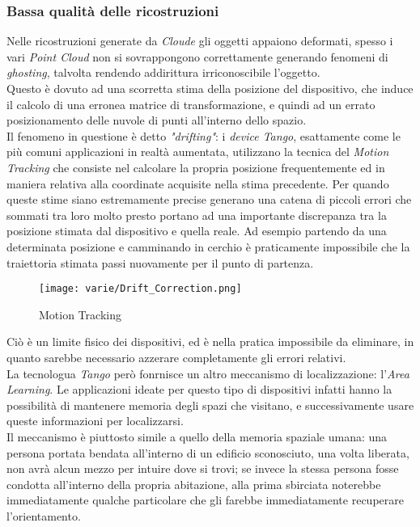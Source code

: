 \subsubsection{Bassa qualità delle ricostruzioni}
Nelle ricostruzioni generate da \emph{Cloude} gli oggetti appaiono deformati, spesso i vari \emph{Point Cloud} non si sovrappongono correttamente generando fenomeni di \emph{ghosting}, talvolta rendendo addirittura irriconoscibile l'oggetto.\\
Questo è dovuto ad una scorretta stima della posizione del dispositivo, che induce il calcolo di una erronea matrice di transformazione, e quindi ad un errato posizionamento delle nuvole di punti all'interno dello spazio.\\
Il fenomeno in questione è detto \emph{"drifting"}: i \emph{device Tango}, esattamente come le più comuni applicazioni in realtà aumentata, utilizzano la tecnica del \emph{Motion Tracking} che consiste nel calcolare la propria posizione frequentemente ed in maniera relativa alla coordinate acquisite nella stima precedente. Per quando queste stime siano estremamente precise generano una catena di piccoli errori che sommati tra loro molto presto portano ad una importante discrepanza tra la posizione stimata dal dispositivo e quella reale. Ad esempio partendo da una determinata posizione e camminando in cerchio è praticamente impossibile che la traiettoria stimata passi nuovamente per il punto di partenza.
\begin{figure}[!h] 
    \centering 
    \texttt{[image: varie/Drift\_Correction.png]} 
    \caption{Motion Tracking}
\end{figure}
Ciò è un limite fisico dei dispositivi, ed è nella pratica impossibile da eliminare, in quanto sarebbe necessario azzerare completamente gli errori relativi.\\
La tecnologua \emph{Tango} però fonrnisce un altro meccanismo di localizzazione: l'\emph{Area Learning}. Le applicazioni ideate per questo tipo di dispositivi infatti hanno la possibilità di mantenere memoria degli spazi che visitano, e successivamente usare queste informazioni per localizzarsi.\\
Il meccanismo è piuttosto simile a quello della memoria spaziale umana: una persona portata bendata all'interno di un edificio sconosciuto, una volta liberata, non avrà alcun mezzo per intuire dove si trovi; se invece la stessa persona fosse condotta all'interno della propria abitazione, alla prima sbirciata noterebbe immediatamente qualche particolare che gli farebbe immediatamente recuperare l'orientamento.\\
